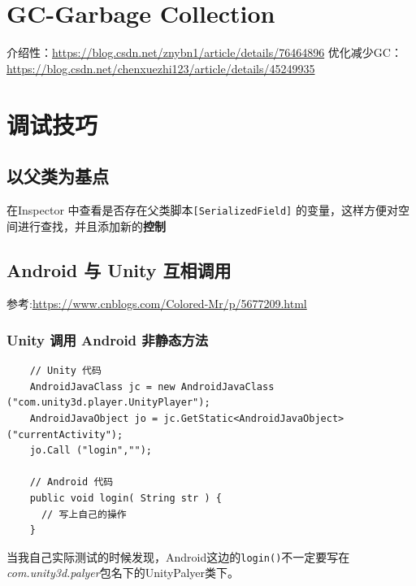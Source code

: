 \documentclass[UTF8,a4paper,12pt]{ctexbook}
\begin{document}
\chapter{GC-Garbage Collection}
	介绍性：\url{https://blog.csdn.net/znybn1/article/details/76464896}
	优化减少GC：\url{https://blog.csdn.net/chenxuezhi123/article/details/45249935}
	\section{}
	
	\section{}
	
	\section{}
		

\chapter{调试技巧}
	\section{以父类为基点}
		在Inspector 中查看是否存在父类脚本\verb|[SerializedField]| 的变量，这样方便对空间进行查找，并且添加新的\textbf{控制}			
	
	
	\section{Android 与 Unity 互相调用}
		参考:\url{https://www.cnblogs.com/Colored-Mr/p/5677209.html}

		\subsection{Unity 调用 Android 非静态方法}
			\begin{lstlisting}
	// Unity 代码
	AndroidJavaClass jc = new AndroidJavaClass ("com.unity3d.player.UnityPlayer");
	AndroidJavaObject jo = jc.GetStatic<AndroidJavaObject> ("currentActivity");
	jo.Call ("login","");	
	
	// Android 代码
	public void login( String str ) {      
      // 写上自己的操作
	}
			\end{lstlisting}
		
			当我自己实际测试的时候发现，Android这边的\verb|login()|不一定要写在\textit{com.unity3d.palyer}包名下的UnityPalyer类下。
			
\end{document}
